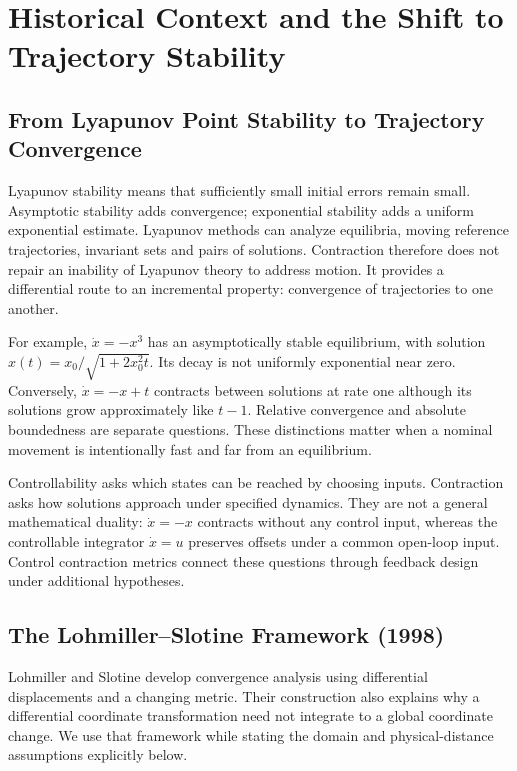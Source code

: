 \section{Historical Context and the Shift to Trajectory Stability}

\subsection{From Lyapunov Point Stability to Trajectory Convergence}

Lyapunov stability means that sufficiently small initial errors remain small. Asymptotic stability adds convergence; exponential stability adds a uniform exponential estimate. Lyapunov methods can analyze equilibria, moving reference trajectories, invariant sets and pairs of solutions. Contraction therefore does not repair an inability of Lyapunov theory to address motion. It provides a differential route to an incremental property: convergence of trajectories to one another.

For example, $\dot x=-x^3$ has an asymptotically stable equilibrium, with solution $x(t)=x_0/\sqrt{1+2x_0^2t}$. Its decay is not uniformly exponential near zero. Conversely, $\dot x=-x+t$ contracts between solutions at rate one although its solutions grow approximately like $t-1$. Relative convergence and absolute boundedness are separate questions. These distinctions matter when a nominal movement is intentionally fast and far from an equilibrium.

Controllability asks which states can be reached by choosing inputs. Contraction asks how solutions approach under specified dynamics. They are not a general mathematical duality: $\dot x=-x$ contracts without any control input, whereas the controllable integrator $\dot x=u$ preserves offsets under a common open-loop input. Control contraction metrics connect these questions through feedback design under additional hypotheses.

\subsection{The Lohmiller--Slotine Framework (1998)}

Lohmiller and Slotine \cite{LohmillerSlotine1998} develop convergence analysis using differential displacements and a changing metric. Their construction also explains why a differential coordinate transformation need not integrate to a global coordinate change. We use that framework while stating the domain and physical-distance assumptions explicitly below.

